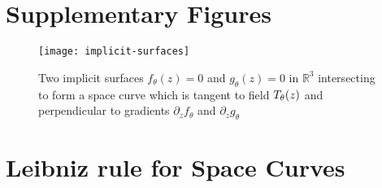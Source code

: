 \section{Supplementary Figures}

\begin{figure}[H]
\centering
\texttt{[image: implicit-surfaces]}
\caption{Two implicit surfaces $f_{\theta}(z)=0$ and $g_{\theta}(z)=0$ in $\mathbb{R}^3$ intersecting to form a space curve which is tangent to field $T_{\theta}(z)$ and perpendicular to gradients $\partial_{z}f_{\theta}$ and $\partial_{z}g_{\theta}$}
\label{fig:implicit-surfaces}
\end{figure}

\section{Leibniz rule for Space Curves}
\label{appendix:leibniz-rule}

